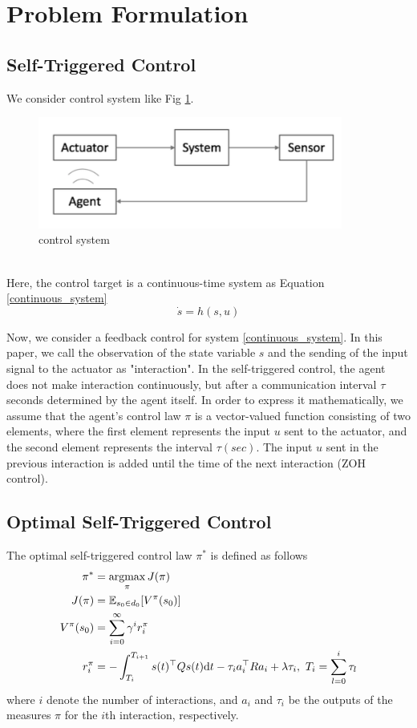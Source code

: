 \documentclass[english, dvipdfmx]{ampmt}             %
\newcommand{\argmax}{\mathop{\rm argmax}\limits}
\newcommand{\expect}{\mathbb{E}}
\begin{document}
\section{Problem Formulation}
\subsection{Self-Triggered Control}
We consider control system like Fig \ref{image}.
\begin{figure}[h]
	\centering
 	\includegraphics[width=10cm]{event.png}
 	\caption{control system} \label{image}
\end{figure}\\
Here, the control target is a continuous-time system as Equation \eqref{continuous_system}
\begin{equation}
	\dot{s} = h(s,u) \label{continuous_system}
\end{equation}\par
Now, we consider a feedback control for system \eqref{continuous_system}. In this paper, we call the observation of the state variable $s$ and the sending of the input signal to the actuator as "interaction". In the self-triggered control, the agent does not make interaction continuously, but after a communication interval $\tau$ seconds determined by the agent itself. In order to express it mathematically, we assume that the agent's control law $\pi$ is a vector-valued function consisting of two elements, where the first element represents the input $u$ sent to the actuator, and the second element represents the interval $\tau (sec)$. The input $u$ sent in the previous interaction is added until the time of the next interaction (ZOH control).

\subsection{Optimal Self-Triggered Control}
The optimal self-triggered control law $\pi^{*}$ is defined as follows
\begin{align}
	\pi^{*} &= \argmax_{\pi}J(\pi) \label{optimal_policy}\\
	J(\pi) &= \expect_{s_0\in d_0}[V^{\pi}(s_0)] \\
	V^{\pi}(s_0) &= \sum_{i=0}^{\infty} \gamma^i r^{\pi}_i \label{value} \\
	r^{\pi}_i &= -\int_{T_i}^{T_{i+1}}s(t)^{\top}Qs(t)\textrm{d}t - \tau_ia_i^{\top}Ra_i + \lambda \tau_i, ~T_i = \sum_{l=0}^{i} \tau_l \label{reward}
\end{align}
where $i$ denote the number of interactions, and $a_i$ and $\tau_i$ be the outputs of the measures $\pi$ for the $i$th interaction, respectively. \par
\end{document}
